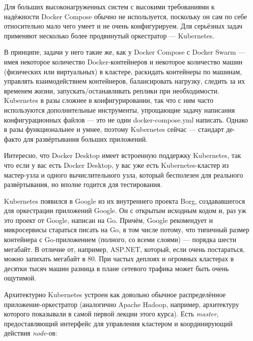 \documentclass[a5paper]{article}
\begin{document}

Для больших высоконагруженных систем с высокими требованиями к надёжности Docker Compose обычно не используется, поскольку он сам по себе относительно мало чего умеет и не очень конфигурируем. Для серьёзных задач применяют несколько более продвинутый оркестратор --- Kubernetes. 

В принципе, задачи у него такие же, как у Docker Compose с Docker Swarm --- имея некоторое количество Docker-контейнеров и некоторое количество машин (физических или виртуальных) в кластере, раскидать контейнеры по машинам, управлять взаимодействием контейнеров, балансировать нагрузку, следить за их временем жизни, запускать/останавливать реплики при необходимости. Kubernetes в разы сложнее в конфигурировании, так что с ним часто используются дополнительные инструменты, упрощающие задачу написания конфигурационных файлов --- это не один docker-compose.yml написать. Однако в разы функциональнее и умнее, поэтому Kubernetes сейчас --- стандарт де-факто для развёртывания больших приложений. 

Интересно, что Docker Desktop имеет встроенную поддержку Kubernetes, так что если у вас есть Docker Desktop, у вас уже есть Kubernetes-кластер из мастер-узла и одного вычислительного узла, который бесполезен для реального развёртывания, но вполне годится для тестирования.

Kubernetes появился в Google из их внутреннего проекта Borg, создававшегося для оркестрации приложений Google. Он с открытым исходным кодом и, раз уж это проект от Google, написан на Go. Причём, Google рекомендует и микросервисы стараться писать на Go, в том числе потому, что типичный размер контейнера с Go-приложением (полного, со всеми слоями) --- порядка шести мегабайт. В отличие от, например, ASP.NET, который, если очень постараться, можно запихать мегабайт в 80. При частых деплоях и огромных кластерах в десятки тысяч машин разница в плане сетевого трафика может быть очень ощутимой.

Архитектурно Kubernetes устроен как довольно обычное распределённое приложение-оркестратор (аналогично Apache Hadoop, например, архитектуру которого показывали в самой первой лекции этого курса). Есть \emph{master}, предоставляющий интерфейс для управления кластером и координирующий действия \emph{node}-ов:
\end{document}
